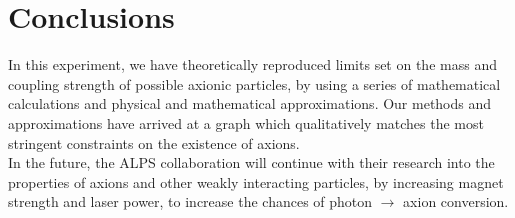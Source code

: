 \documentclass[12pt]{article}
\begin{document}
\section{Conclusions}
\label{sec:conclusions}

In this experiment, we have theoretically reproduced limits set on the mass and coupling strength of possible axionic particles, by using a series of mathematical calculations and physical and mathematical approximations. Our methods and approximations have arrived at a graph which qualitatively matches the most stringent constraints on the existence of axions. \\
In the future, the ALPS collaboration will continue with their research into the properties of axions and other weakly interacting particles, by increasing magnet strength and laser power, to increase the chances of photon $\rightarrow$ axion conversion. 

\printbibliography
\end{document}
